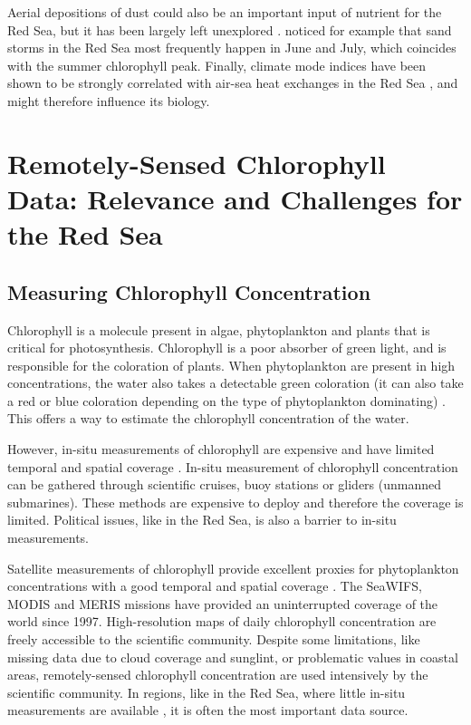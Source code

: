 Aerial depositions of dust could also be an important input of nutrient for the Red Sea, but it has been largely left unexplored \cite{Triantafyllou2014}. \cite{Raitsos2013} noticed for example that sand storms in the Red Sea most frequently happen in June and July, which coincides with the summer chlorophyll peak. Finally, climate mode indices have been shown to be strongly correlated with air-sea heat exchanges in the Red Sea \cite{Abulnaja2015}, and might therefore influence its biology.

\section{Remotely-Sensed Chlorophyll Data: Relevance and Challenges for the Red
Sea}

\subsection{Measuring Chlorophyll Concentration}

Chlorophyll is a molecule present in algae, phytoplankton and plants that is critical for photosynthesis. Chlorophyll is a poor absorber of green light, and is responsible for the coloration of plants. When phytoplankton are present in high concentrations, the water also takes a detectable green coloration (it can also take a red or blue coloration depending on the type of phytoplankton dominating) \cite{Robinson2010}. This offers a way to estimate the chlorophyll concentration of the water.

However, in-situ measurements of chlorophyll are expensive and have limited temporal and spatial coverage \cite{Robinson2010}. In-situ measurement of chlorophyll concentration can be gathered through scientific cruises, buoy stations or gliders (unmanned submarines). These methods are expensive to deploy and therefore the coverage is limited. Political issues, like in the Red Sea, is also a barrier to in-situ measurements.

Satellite measurements of chlorophyll provide excellent proxies for phytoplankton concentrations with a good temporal and spatial coverage \cite{Robinson2010}. The SeaWIFS, MODIS and MERIS missions have provided an uninterrupted coverage of the world since 1997. High-resolution maps of daily chlorophyll concentration are freely accessible to the scientific community. Despite some limitations, like missing data due to cloud coverage and sunglint, or problematic values in coastal areas, remotely-sensed chlorophyll concentration are used intensively by the scientific community. In regions, like in the Red Sea, where little in-situ measurements are available \cite{Raitsos2013}, it is often the most important data source.

